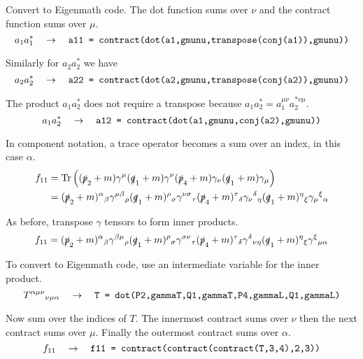 \documentclass[12pt]{article}
\begin{document}
Convert to Eigenmath code.
The dot function sums over $\nu$ and the contract function sums over $\mu$.
\begin{equation*}
a_1a_1^*
\quad\rightarrow\quad
\text{\tt a11 = contract(dot(a1,gmunu,transpose(conj(a1)),gmunu))}
\end{equation*}

Similarly for $a_2a_2^*$ we have
\begin{equation*}
a_2a_2^*
\quad\rightarrow\quad
\text{\tt a22 = contract(dot(a2,gmunu,transpose(conj(a2)),gmunu))}
\end{equation*}

The product $a_1a_2^*$ does not require a transpose because $a_1a_2^*=a_1^{\mu\nu}a_2^{*\nu\mu}$.
\begin{equation*}
a_1a_2^*
\quad\rightarrow\quad
\text{\tt a12 = contract(dot(a1,gmunu,conj(a2),gmunu))}
\end{equation*}

In component notation, a trace operator becomes a sum over an index, in this case $\alpha$.
\begin{align*}
f_{11}
&=
\mathop{\rm Tr}
\left(
(\slashed{p}_2+m)\gamma^\mu(\slashed{q}_1+m)\gamma^\nu(\slashed{p}_4+m)\gamma_\nu(\slashed{q}_1+m)\gamma_\mu
\right)\\
&=
(\slashed{p}_2+m)^\alpha{}_\beta
\gamma^{\mu\beta}{}_\rho
(\slashed{q}_1+m)^\rho{}_\sigma
\gamma^{\nu\sigma}{}_\tau
(\slashed{p}_4+m)^\tau{}_\delta
\gamma_\nu{}^\delta{}_\eta
(\slashed{q}_1+m)^\eta{}_\xi
\gamma_\mu{}^\xi{}_\alpha
\end{align*}

As before, transpose $\gamma$ tensors to form inner products.
\begin{equation*}
f_{11}=
(\slashed{p}_2+m)^\alpha{}_\beta
\gamma^{\beta\mu}{}_\rho
(\slashed{q}_1+m)^\rho{}_\sigma
\gamma^{\sigma\nu}{}_\tau
(\slashed{p}_4+m)^\tau{}_\delta
\gamma^\delta{}_{\nu\eta}
(\slashed{q}_1+m)^\eta{}_\xi
\gamma^\xi{}_{\mu\alpha}
\end{equation*}

To convert to Eigenmath code, use an intermediate variable for the inner product.
\begin{equation*}
T^{\alpha\mu\nu}{}_{\nu\mu\alpha}
\quad\rightarrow\quad
\text{\tt T = dot(P2,gammaT,Q1,gammaT,P4,gammaL,Q1,gammaL)}
\end{equation*}

Now sum over the indices of $T$.
The innermost contract sums over $\nu$ then the next contract sums over $\mu$.
Finally the outermost contract sums over $\alpha$.
\begin{equation*}
f_{11}\quad\rightarrow\quad
\text{\tt f11 = contract(contract(contract(T,3,4),2,3))}
\end{equation*}
\end{document}
